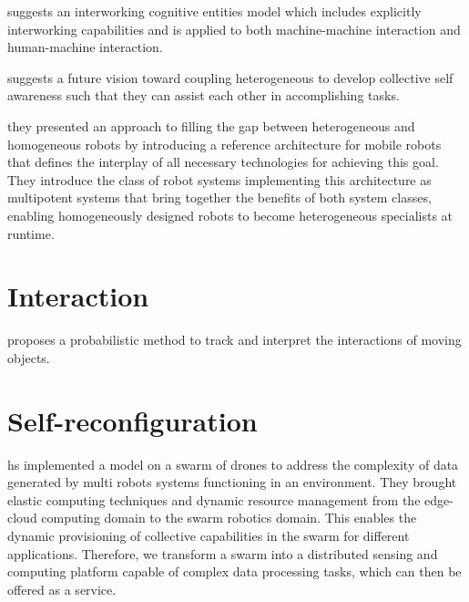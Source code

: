 \documentclass{article}
\begin{document}
	\cite{celentano-2016-multi-robot-systems-machine-machine-and-human-machine-interaction-and-their-modelling} suggests an interworking cognitive entities model which includes explicitly interworking capabilities and is applied to both machine-machine interaction and human-machine interaction.
	
	
	\cite{diaconescu-2017-architectures-for-collective-self-aware-computing-systems}
	\cite{gerasimou-2019-towards-systematic-engineering-of-collaborative-heterogeneous-robotic-systems} suggests a future vision toward coupling heterogeneous to develop collective self awareness such that they can assist each other in accomplishing tasks.
	
	\cite{kosak-2019-multipotent-systems-combining-planning-self-organization-and-reconfiguration-in-modular-robot-ensembles} they presented an approach to filling the gap between heterogeneous and homogeneous robots by introducing a reference architecture for mobile robots that defines the interplay of all necessary technologies for achieving this goal. They introduce the class of robot systems implementing this architecture as multipotent systems that bring together the benefits of both system classes, enabling homogeneously designed robots to become heterogeneous specialists at runtime.
	
	
	
	\section{Interaction}
	\cite{baydoun-2020-prediction-of-multi-target-dynamics-using-discrete-descriptors-an-interactive-approach} proposes a probabilistic method to track and interpret the interactions of moving objects.
		
	\section{Self-reconfiguration}
		\cite{pena-2019-blockchain-powered-collaboration-in-heterogeneous-swarms-of-robots} hs implemented a model on a swarm of drones to address the complexity of data generated by multi robots systems functioning in an environment. They  brought elastic computing techniques and dynamic resource management from the edge-cloud computing domain to the swarm robotics domain. This enables the dynamic provisioning of collective capabilities in the swarm for
		different applications. Therefore, we transform a swarm into a distributed sensing and computing platform capable of complex data processing tasks, which can then be offered as a service.
	
\end{document}
